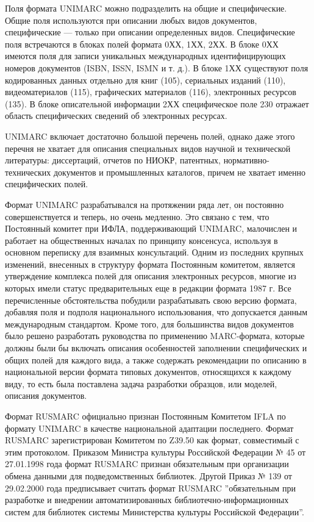 Поля формата UNIMARC можно подразделить на общие и специфические. Общие поля используются при описании любых видов документов, специфические — только при описании определенных видов. Специфические поля встречаются в блоках полей формата 0ХХ, 1ХХ, 2ХХ. В блоке 0ХХ имеются поля для записи уникальных международных идентифицирующих номеров документов (ISBN, ISSN, ISMN и т. д.). В блоке 1ХХ существуют поля кодированных данных отдельно для книг (105), сериальных изданий (110), видеоматериалов (115), графических материалов (116), электронных ресурсов (135). В блоке описательной информации 2ХХ специфическое поле 230 отражает область специфических сведений об электронных ресурсах.

UNIMARC включает достаточно большой перечень полей, однако даже этого перечня не хватает для описания специальных видов научной и технической литературы: диссертаций, отчетов по НИОКР, патентных, нормативно-технических документов и промышленных каталогов, причем не хватает именно специфических полей.

Формат UNIMARC разрабатывался на протяжении ряда лет, он постоянно совершенствуется и теперь, но очень медленно. Это связано с тем, что Постоянный комитет при ИФЛА, поддерживающий UNIMARC, малочислен и работает на общественных началах по принципу консенсуса, используя в основном переписку для взаимных консультаций. Одним из последних крупных изменений, внесенных в структуру формата Постоянным комитетом, является утверждение комплекса полей для описания электронных ресурсов, многие из которых имели статус предварительных еще в редакции формата 1987 г. Все перечисленные обстоятельства побудили разрабатывать свою версию формата, добавляя поля и подполя национального использования, что допускается данным международным стандартом. Кроме того, для большинства видов документов было решено разработать руководства по применению MARC-формата, которые должны были бы включать описания особенностей заполнении специфических и общих полей для каждого вида, а также содержать рекомендации по описанию в национальной версии формата типовых документов, относящихся к каждому виду, то есть была поставлена задача разработки образцов, или моделей, описания документов.

Формат RUSMARC официально признан Постоянным Комитетом IFLA по формату UNIMARC в качестве национальной адаптации последнего.
Формат RUSMARC зарегистрирован Комитетом по Z39.50 как формат, совместимый с этим протоколом.
Приказом Министра культуры  Российской Федерации № 45 от 27.01.1998 года формат RUSMARC признан обязательным при организации обмена данными для подведомственных библиотек.
Другой Приказ № 139 от 29.02.2000  года предписывает считать формат RUSMARC ”обязательным при разработке и внедрении автоматизированных библиотечно-информационных систем для библиотек системы Министерства культуры Российской Федерации”.

